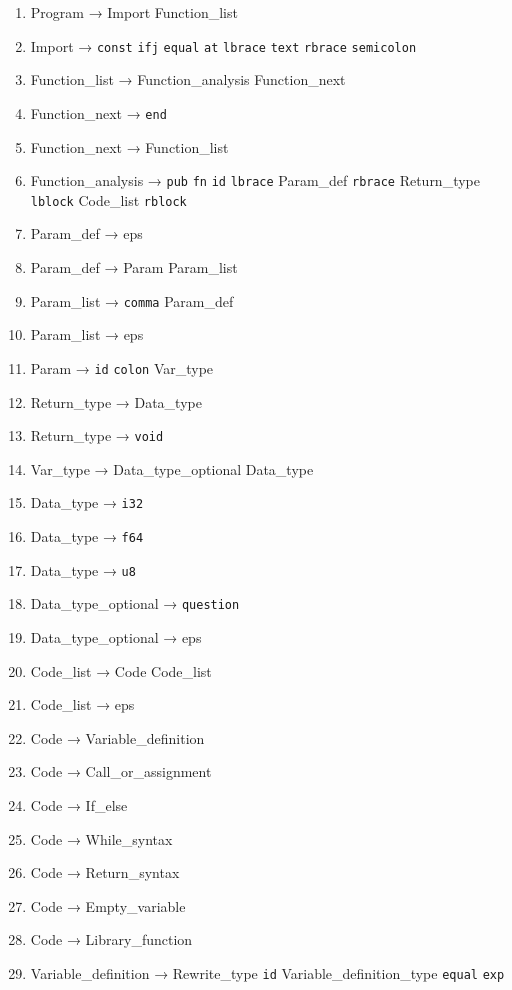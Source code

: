 \documentclass[a4paper, 12pt]{article}
\begin{document}
\begin{enumerate}
    \item Program → Import Function\_list
    \item Import → \texttt{const} \texttt{ifj} \texttt{equal} \texttt{at} \texttt{lbrace} \texttt{text} \texttt{rbrace} \texttt{semicolon}
    \item Function\_list → Function\_analysis Function\_next
    \item Function\_next → \texttt{end}
    \item Function\_next → Function\_list
    \item Function\_analysis → \texttt{pub} \texttt{fn} \texttt{id} \texttt{lbrace} Param\_def \texttt{rbrace} Return\_type \texttt{lblock} Code\_list \texttt{rblock}
    \item Param\_def → eps
    \item Param\_def → Param Param\_list
    \item Param\_list → \texttt{comma} Param\_def
    \item Param\_list → eps
    \item Param → \texttt{id} \texttt{colon} Var\_type
    \item Return\_type → Data\_type
    \item Return\_type → \texttt{void}
    \item Var\_type → Data\_type\_optional Data\_type
    \item Data\_type → \texttt{i32}
    \item Data\_type → \texttt{f64}
    \item Data\_type → \texttt{u8}
    \item Data\_type\_optional → \texttt{question}
    \item Data\_type\_optional → eps
    \item Code\_list → Code Code\_list
    \item Code\_list → eps
    \item Code → Variable\_definition
    \item Code → Call\_or\_assignment
    \item Code → If\_else
    \item Code → While\_syntax
    \item Code → Return\_syntax
    \item Code → Empty\_variable
    \item Code → Library\_function
    \item Variable\_definition → Rewrite\_type \texttt{id} Variable\_definition\_type \texttt{equal} \texttt{exp}

\end{enumerate}
\end{document}
